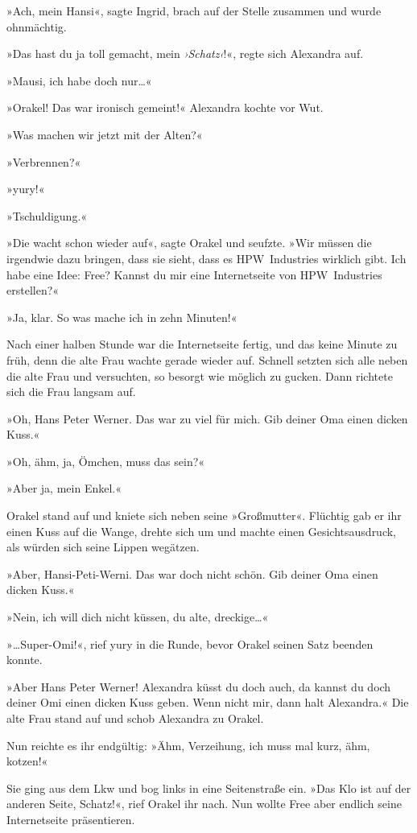 »Ach, mein Hansi«, sagte Ingrid, brach auf der Stelle zusammen und wurde ohnmächtig.

»Das hast du ja toll gemacht, mein \emph{›Schatz‹}!«, regte sich Alexandra auf.

»Mausi, ich habe doch nur…«

»Orakel! Das war ironisch gemeint!« Alexandra kochte vor Wut.

»Was machen wir jetzt mit der Alten?«

»Verbrennen?«

»yury!«

»Tschuldigung.«

»Die wacht schon wieder auf«, sagte Orakel und seufzte. »Wir müssen die irgendwie dazu bringen, dass sie sieht, dass es HPW~Industries wirklich gibt. Ich habe eine Idee: Free? Kannst du mir eine Internetseite von HPW~Industries erstellen?«

»Ja, klar. So was mache ich in zehn Minuten!«

Nach einer halben Stunde war die Internetseite fertig, und das keine Minute zu früh, denn die alte Frau wachte gerade wieder auf. Schnell setzten sich alle neben die alte Frau und versuchten, so besorgt wie möglich zu gucken. Dann richtete sich die Frau langsam auf.

»Oh, Hans Peter Werner. Das war zu viel für mich. Gib deiner Oma einen dicken Kuss.«

»Oh, ähm, ja, Ömchen, muss das sein?«

»Aber ja, mein Enkel.«

Orakel stand auf und kniete sich neben seine »Großmutter«. Flüchtig gab er ihr einen Kuss auf die Wange, drehte sich um und machte einen Gesichtsausdruck, als würden sich seine Lippen wegätzen.

»Aber, Hansi-Peti-Werni. Das war doch nicht schön. Gib deiner Oma einen dicken Kuss.«

»Nein, ich will dich nicht küssen, du alte, dreckige…«

»…Super-Omi!«, rief yury in die Runde, bevor Orakel seinen Satz beenden konnte.

»Aber Hans Peter Werner! Alexandra küsst du doch auch, da kannst du doch deiner Omi einen dicken Kuss geben. Wenn nicht mir, dann halt Alexandra.« Die alte Frau stand auf und schob Alexandra zu Orakel.

Nun reichte es ihr endgültig: »Ähm, Verzeihung, ich muss mal kurz, ähm, kotzen!«

Sie ging aus dem Lkw und bog links in eine Seitenstraße ein. »Das Klo ist auf der anderen Seite, Schatz!«, rief Orakel ihr nach. Nun wollte Free aber endlich seine Internetseite präsentieren.

